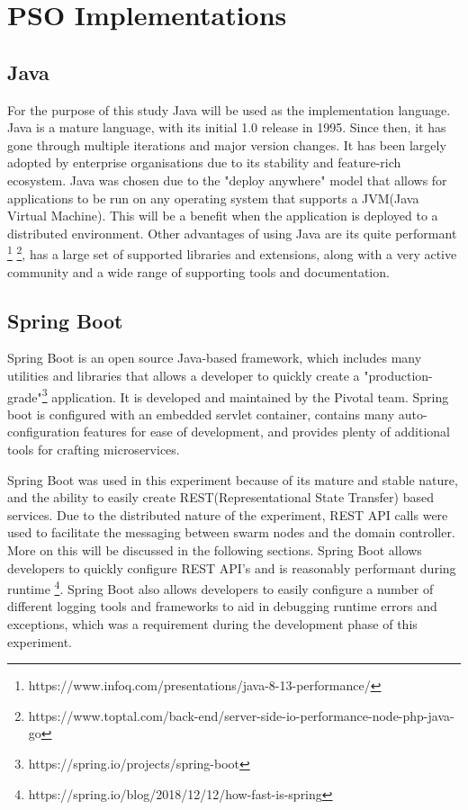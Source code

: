 \documentclass[oneside,12pt]{book}
\begin{document}
\section{PSO Implementations}

\subsection{Java}
For the purpose of this study Java will be used as the implementation language. Java is a mature language, with its initial 1.0 release in 1995. Since then, it has gone through multiple iterations and major version changes. It has been largely adopted by enterprise organisations due to its stability and feature-rich ecosystem. Java was chosen due to the "deploy anywhere" model that allows for applications to be run on any operating system that supports a JVM(Java Virtual Machine). This will be a benefit when the application is deployed to a distributed environment. Other advantages of using Java are its quite performant \footnote{https://www.infoq.com/presentations/java-8-13-performance/} \footnote{https://www.toptal.com/back-end/server-side-io-performance-node-php-java-go}, has a large set of supported libraries and extensions, along with a very active community and a wide range of supporting tools and documentation.

\subsection{Spring Boot}
Spring Boot is an open source Java-based framework, which includes many utilities and libraries that allows a developer to quickly create a "production-grade"\footnote{https://spring.io/projects/spring-boot} application. It is developed and maintained by the Pivotal team. Spring boot is configured with an embedded servlet container, contains many auto-configuration features for ease of development, and provides plenty of additional tools for crafting microservices. 

Spring Boot was used in this experiment because of its mature and stable nature, and the ability to easily create REST(Representational State Transfer) based services. Due to the distributed nature of the experiment, REST API calls were used to facilitate the messaging between swarm nodes and the domain controller. More on this will be discussed in the following sections. Spring Boot allows developers to quickly configure REST API's and is reasonably performant during runtime \footnote{https://spring.io/blog/2018/12/12/how-fast-is-spring}. Spring Boot also allows developers to easily configure a number of different logging tools and frameworks to aid in debugging runtime errors and exceptions, which was a requirement during the development phase of this experiment. 
\end{document}
